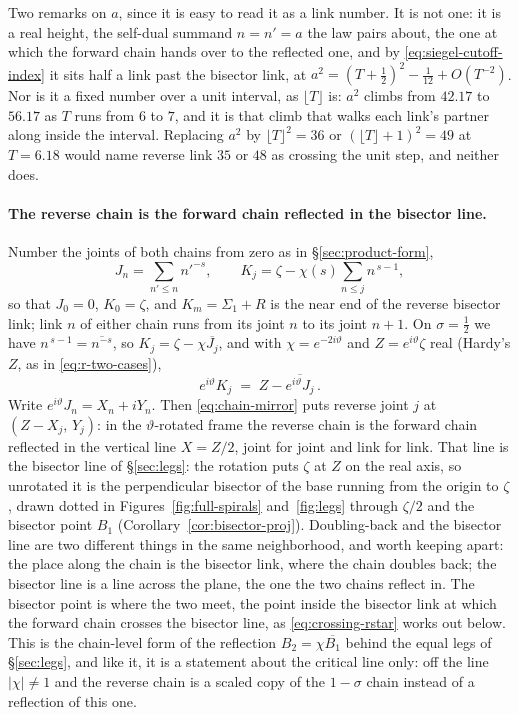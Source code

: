 \documentclass[11pt]{article}
\theoremstyle{definition}
\begin{document}
Two remarks on $a$, since it is easy to read it as a link number. It is not one:
it is a real height, the self-dual summand $n=n'=a$ the law pairs about, the
one at which the forward chain hands over to the reflected one, and by
\eqref{eq:siegel-cutoff-index} it sits half a link past the bisector link, at $a^{2}=(T+\tfrac12)^{2}-\tfrac1{12}+O(T^{-2})$. Nor is it
a fixed number over a unit interval, as $\lfloor T\rfloor$ is: $a^{2}$ climbs
from $42.17$ to $56.17$ as $T$ runs from $6$ to $7$, and it is that climb that
walks each link's partner along inside the interval. Replacing $a^{2}$ by
$\lfloor T\rfloor^{2}=36$ or $(\lfloor T\rfloor+1)^{2}=49$ at $T=6.18$ would
name reverse link $35$ or $48$ as crossing the unit step, and neither does.

\paragraph{The reverse chain is the forward chain reflected in the bisector line.} Number the joints
of both chains from zero as in \S\ref{sec:product-form},
\begin{equation}\label{eq:crossing-joints}
J_n=\sum_{n'\leq n}n'^{-s},
\qquad
K_j=\zeta-\chi(s)\sum_{n\leq j}n^{\,s-1},
\end{equation}
so that $J_0=0$, $K_0=\zeta$, and $K_m=\Sigma_1+R$ is the near end of the
reverse bisector link; link $n$ of either chain runs from its joint $n$ to its
joint $n+1$. On $\sigma=\tfrac12$ we have $n^{\,s-1}=\overline{n^{-s}}$, so
$K_j=\zeta-\chi\overline{J_j}$, and with $\chi=e^{-2i\vartheta}$ and
$Z=e^{i\vartheta}\zeta$ real (Hardy's $Z$, as in \eqref{eq:r-two-cases}),
\begin{equation}\label{eq:chain-mirror}
e^{i\vartheta}K_j \;=\; Z-\overline{e^{i\vartheta}J_j}\,.
\end{equation}
Write $e^{i\vartheta}J_n=X_n+iY_n$. Then \eqref{eq:chain-mirror} puts reverse
joint $j$ at $(Z-X_j,\,Y_j)$: in the $\vartheta$-rotated frame the reverse chain
is the forward chain reflected in the vertical line $X=Z/2$, joint for joint and
link for link. That line is the bisector line of \S\ref{sec:legs}: the
rotation puts $\zeta$ at $Z$ on the real axis, so unrotated it is the
perpendicular bisector of the base running from the origin to $\zeta$, drawn
dotted in
Figures~\ref{fig:full-spirals} and~\ref{fig:legs} through $\zeta/2$ and the
bisector point $B_1$ (Corollary~\ref{cor:bisector-proj}). Doubling-back and the
bisector line are
two different things in the same neighborhood, and worth keeping apart: the
place along the chain is the bisector link, where the chain doubles
back; the bisector line is a line across the plane, the one the two chains
reflect in. The bisector point is where the two meet, the point inside the
bisector link at which the forward chain crosses the bisector line, as
\eqref{eq:crossing-rstar} works out below. This is the
chain-level form of the reflection
$B_2=\chi\overline{B_1}$ behind the equal legs of \S\ref{sec:legs}, and like it,
it is a statement about the critical line only: off the line $|\chi|\neq1$ and
the reverse chain is a scaled copy of the $1-\sigma$ chain instead of a
reflection of this one.
\end{document}
